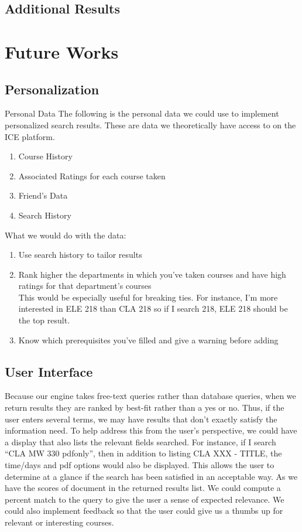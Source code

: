 \documentclass[12pt,letterpaper]{article}
\begin{document}
\subsection{Additional Results}


\section{Future Works}

\subsection{Personalization}

Personal Data
The following is the personal data we could use to implement personalized search results. These are data we theoretically have access to on the ICE platform.
\begin{enumerate}
\item Course History
\item Associated Ratings for each course taken
\item Friend's Data
\item Search History
\end{enumerate}
What we would do with the data:
\begin{enumerate}
\item Use search history to tailor results

\item Rank higher the departments in which you've taken courses and have high ratings for that department's courses \\

This would be especially useful for breaking ties. For instance, I'm more interested in ELE 218 than CLA 218 so if I search 218, ELE 218 should be the top result. 

\item Know which prerequisites you've filled and give a warning before adding

\end{enumerate}

	
\subsection{User Interface}
Because our engine takes free-text queries rather than database queries, when we return results they are ranked by best-fit rather than a yes or no. Thus, if the user enters several terms, we may have results that don't exactly satisfy the information need. To help address this from the user's perspective, we could have a display that also lists the relevant fields searched. For instance, if I search ``CLA MW 330 pdfonly'', then in addition to listing CLA XXX - TITLE, the time/days and pdf options would also be displayed. This allows the user to determine at a glance if the search has been satisfied in an acceptable way. 
As we have the scores of document in the returned results list. We could compute a percent match to the query to give the user a sense of expected relevance. We could also implement feedback so that the user could give us a thumbs up for relevant or interesting courses. 
\end{document}
